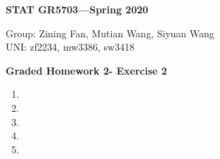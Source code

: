 \documentclass[11pt]{article}
\begin{document}
\begin{flushright}
{\bf STAT GR5703---Spring 2020}
\end{flushright}
\begin{flushleft}
Group: Zining Fan, Mutian Wang, Siyuan Wang\\
UNI: zf2234, mw3386, sw3418\\
\end{flushleft}

\bigskip
\centerline{\bf Graded Homework 2- Exercise 2}

\bigskip 
\begin{enumerate}
\item
\item
\item
\item
\item
\end{enumerate}
\end{document}
